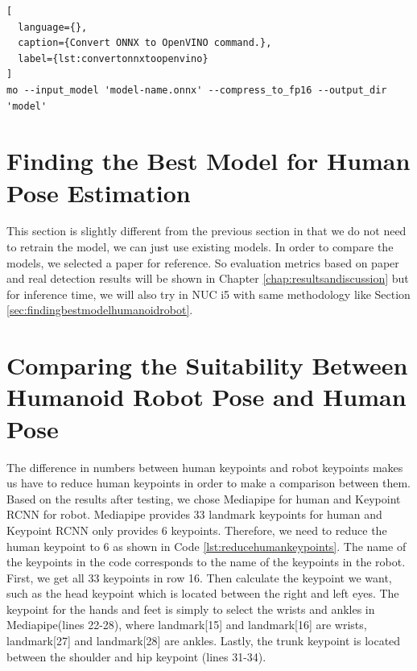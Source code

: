 \begin{lstlisting}[
  language={},
  caption={Convert ONNX to OpenVINO command.},
  label={lst:convertonnxtoopenvino}
]
mo --input_model 'model-name.onnx' --compress_to_fp16 --output_dir 'model'
\end{lstlisting}




\section{Finding the Best Model for Human Pose Estimation}
\label{sec:findingbestmodelhumanrobot}

This section is slightly different from the previous section in that we do not need to retrain the model, we can just use existing models.
In order to compare the models, we selected a paper for reference. So evaluation metrics based on paper and real detection results will be shown in Chapter \ref{chap:resultsandiscussion} but for inference time, we will also try in NUC i5 with same methodology like Section \ref{sec:findingbestmodelhumanoidrobot}.

\section{Comparing the Suitability Between Humanoid Robot Pose and Human Pose}
\label{sec:comparingsuitability}

The difference in numbers between human keypoints and robot keypoints makes us have to reduce human keypoints in order to make a comparison between them.
Based on the results after testing, we chose Mediapipe for human and Keypoint RCNN for robot. Mediapipe provides 33 landmark keypoints for human and Keypoint RCNN only provides 6 keypoints.
Therefore, we need to reduce the human keypoint to 6 as shown in Code \ref{lst:reducehumankeypoints}.
The name of the keypoints in the code corresponds to the name of the keypoints in the robot. First, we get all 33 keypoints in row 16. Then calculate the keypoint we want, such as the head keypoint which is located between the right and left eyes.
The keypoint for the hands and feet is simply to select the wrists and ankles in Mediapipe(lines 22-28), where landmark[15] and landmark[16] are wrists, landmark[27] and landmark[28] are ankles. Lastly, the trunk keypoint is located between the shoulder and hip keypoint (lines 31-34).

